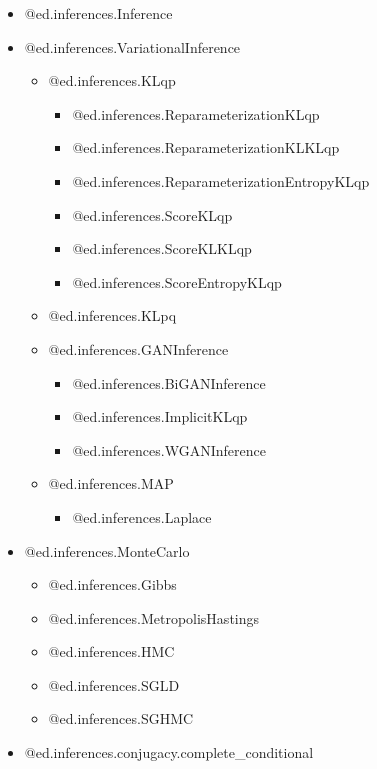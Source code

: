 \begin{itemize}
  \item @{ed.inferences.Inference}
  \item @{ed.inferences.VariationalInference}
    \begin{itemize}
    \item @{ed.inferences.KLqp}
      \begin{itemize}
      \item @{ed.inferences.ReparameterizationKLqp}
      \item @{ed.inferences.ReparameterizationKLKLqp}
      \item @{ed.inferences.ReparameterizationEntropyKLqp}
      \item @{ed.inferences.ScoreKLqp}
      \item @{ed.inferences.ScoreKLKLqp}
      \item @{ed.inferences.ScoreEntropyKLqp}
      \end{itemize}
    \item @{ed.inferences.KLpq}
    \item @{ed.inferences.GANInference}
      \begin{itemize}
      \item @{ed.inferences.BiGANInference}
      \item @{ed.inferences.ImplicitKLqp}
      \item @{ed.inferences.WGANInference}
      \end{itemize}
    \item @{ed.inferences.MAP}
      \begin{itemize}
      \item @{ed.inferences.Laplace}
      \end{itemize}
    \end{itemize}
  \item @{ed.inferences.MonteCarlo}
    \begin{itemize}
    \item @{ed.inferences.Gibbs}
    \item @{ed.inferences.MetropolisHastings}
    \item @{ed.inferences.HMC}
    \item @{ed.inferences.SGLD}
    \item @{ed.inferences.SGHMC}
    \end{itemize}
  \item @{ed.inferences.conjugacy.complete_conditional}
\end{itemize}

